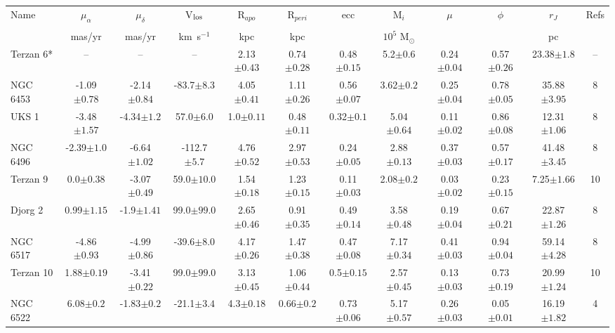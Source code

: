 \begin{landscape}
\begin{table}
\footnotesize
\begin{tabular}{lccccccccccc}
\hline
Name & $\mu_{\alpha}$ & $\mu_{\delta}$ & V$_{\rm los}$ & R$_{apo}$ & R$_{peri}$ & ecc & M$_{i}$ & $\mu$ & $\phi$ & $r_J$ & Refs \\\\
 & mas/yr & mas/yr & km$\,$ s$^{-1}$ & kpc & kpc & & $10^5$ M$_{\odot}$ & & & pc & \\
\hline
\hline
Terzan 6* & -- & -- & -- & 2.13$\pm{0.43}$ & 0.74$\pm{0.28}$ & 0.48$\pm{0.15}$ & 5.2$\pm{0.6}$ & 0.24$\pm{0.04}$ & 0.57$\pm{0.26}$ & 23.38$\pm{1.8}$&-- \\ 
NGC 6453 & -1.09$\pm{0.78}$ & -2.14$\pm{0.84}$ & -83.7$\pm{8.3}$ & 4.05$\pm{0.41}$ & 1.11$\pm{0.26}$ & 0.56$\pm{0.07}$ & 3.62$\pm{0.2}$ & 0.25$\pm{0.04}$ & 0.78$\pm{0.05}$ & 35.88$\pm{3.95}$&8 \\ 
UKS 1 & -3.48$\pm{1.57}$ & -4.34$\pm{1.2}$ & 57.0$\pm{6.0}$ & 1.0$\pm{0.11}$ & 0.48$\pm{0.11}$ & 0.32$\pm{0.1}$ & 5.04$\pm{0.64}$ & 0.11$\pm{0.02}$ & 0.86$\pm{0.08}$ & 12.31$\pm{1.06}$&8 \\ 
NGC 6496 & -2.39$\pm{1.0}$ & -6.64$\pm{1.02}$ & -112.7$\pm{5.7}$ & 4.76$\pm{0.52}$ & 2.97$\pm{0.53}$ & 0.24$\pm{0.05}$ & 2.88$\pm{0.13}$ & 0.37$\pm{0.03}$ & 0.57$\pm{0.17}$ & 41.48$\pm{3.45}$&8 \\ 
Terzan 9 & 0.0$\pm{0.38}$ & -3.07$\pm{0.49}$ & 59.0$\pm{10.0}$ & 1.54$\pm{0.18}$ & 1.23$\pm{0.15}$ & 0.11$\pm{0.03}$ & 2.08$\pm{0.2}$ & 0.03$\pm{0.02}$ & 0.23$\pm{0.15}$ & 7.25$\pm{1.66}$&10 \\ 
Djorg 2 & 0.99$\pm{1.15}$ & -1.9$\pm{1.41}$ & 99.0$\pm{99.0}$ & 2.65$\pm{0.46}$ & 0.91$\pm{0.35}$ & 0.49$\pm{0.14}$ & 3.58$\pm{0.48}$ & 0.19$\pm{0.04}$ & 0.67$\pm{0.21}$ & 22.87$\pm{1.26}$&8 \\ 
NGC 6517 & -4.86$\pm{0.93}$ & -4.99$\pm{0.86}$ & -39.6$\pm{8.0}$ & 4.17$\pm{0.26}$ & 1.47$\pm{0.38}$ & 0.47$\pm{0.08}$ & 7.17$\pm{0.34}$ & 0.41$\pm{0.03}$ & 0.94$\pm{0.04}$ & 59.14$\pm{4.28}$&8 \\ 
Terzan 10 & 1.88$\pm{0.19}$ & -3.41$\pm{0.22}$ & 99.0$\pm{99.0}$ & 3.13$\pm{0.45}$ & 1.06$\pm{0.44}$ & 0.5$\pm{0.15}$ & 2.57$\pm{0.45}$ & 0.13$\pm{0.03}$ & 0.73$\pm{0.19}$ & 20.99$\pm{1.24}$&10 \\ 
NGC 6522 & 6.08$\pm{0.2}$ & -1.83$\pm{0.2}$ & -21.1$\pm{3.4}$ & 4.3$\pm{0.18}$ & 0.66$\pm{0.2}$ & 0.73$\pm{0.06}$ & 5.17$\pm{0.57}$ & 0.26$\pm{0.03}$ & 0.05$\pm{0.01}$ & 16.19$\pm{1.82}$&4 \\ 

\end{tabular}
\end{table}
\end{landscape}
